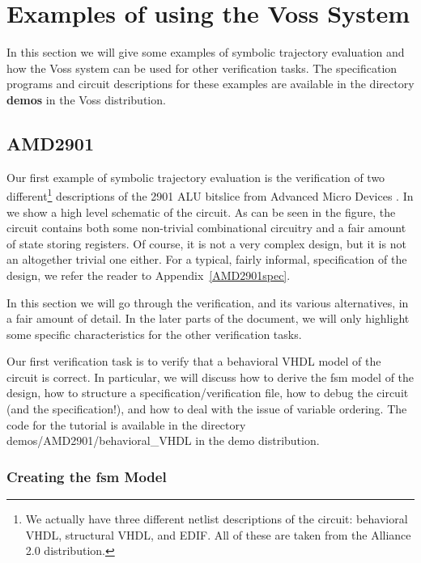 \section{Examples of using the Voss System}
\label{tutorial}

In this section we will give some examples of
symbolic trajectory evaluation and how the Voss system
can be used for other verification tasks.
The specification programs and circuit descriptions for these examples
are available in the directory {\bf demos} in the Voss distribution.

\subsection{AMD2901}

Our first example of symbolic trajectory evaluation is the
verification of two different\footnote{We actually have three different
netlist descriptions of the circuit: behavioral VHDL, structural
VHDL, and EDIF.  All of these are taken from the Alliance 2.0 distribution.}
descriptions of the 2901%
%
{} ALU bitslice%
%
{} from Advanced Micro Devices%
%
{}.
In  we show a high level schematic of the circuit.
As can be seen in the figure, the circuit contains both some
non-trivial combinational circuitry and a fair amount of state
storing registers.
Of course, it is not a very complex design, but it is not
an altogether trivial one either.
For a typical, fairly informal, specification%
%
{} of the design, we refer the
reader to Appendix~\ref{AMD2901spec}.

In this section we will go through the verification, and its various
alternatives, in a fair amount of detail.
In the later parts of the document, we will only highlight
some specific characteristics for the other verification tasks.

Our first verification task is to verify that a behavioral VHDL%
%
{} model of the circuit is correct.
In particular, we will discuss how to derive the fsm model of the design,
how to structure a specification/verification file, how to debug the
circuit (and the specification!), and how to deal with the issue of
variable ordering.
The code for the tutorial is available in the directory
demos/AMD2901/behavioral\_VHDL in the demo distribution.

\subsubsection{Creating the fsm Model}


